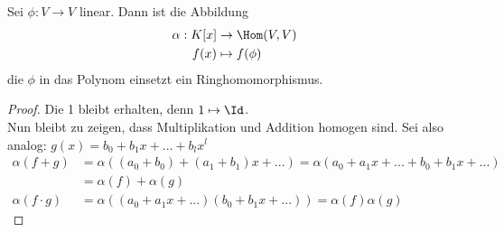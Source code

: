 \documentclass[a4paper, 10pt]{scrbook}
\begin{document}
\begin{lem}
	\label{lem:12.8}
	Sei $\phi:V\to V$ linear.
	Dann ist die Abbildung
	\begin{align*}
		\alpha:K[x] &\to \Hom(V,V)\\
			  f(x) &\mapsto f(\phi)
	\end{align*}
	die $\phi$ in das Polynom einsetzt ein Ringhomomorphismus.
	
	\begin{proof}
		Die 1 bleibt erhalten, denn $ 1 \mapsto \Id$.  \\
		Nun bleibt zu zeigen, dass Multiplikation und Addition homogen sind. Sei also analog: $g(x)=b_0+b_1x+...+b_lx^l$
		\begin{align*}
		\alpha(f+g)&=\alpha((a_0+b_0)+(a_1+b_1)x+...)=\alpha(a_0+a_1x+...+b_0+b_1x+...)\\ &=\alpha(f)+\alpha(g) \\
		\alpha(f\cdot g)&=\alpha((a_0+a_1x+...)(b_0+b_1x+...))=\alpha(f)\alpha(g)
		\end{align*}
		
		
	\end{proof}
\end{lem}
\end{document}
